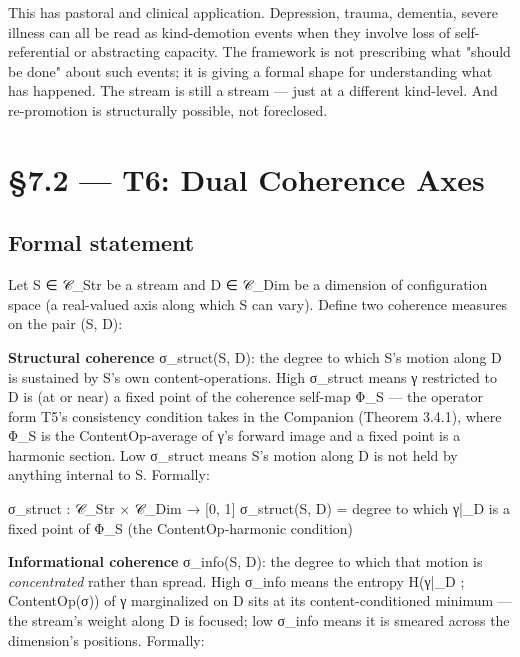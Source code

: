 \documentclass[11pt, openany]{book}
\newcommand{\sectionbreak}{\clearpage}
\begin{document}
This has pastoral and clinical application. Depression, trauma, dementia, severe illness can all be read as kind-demotion events when they involve loss of self-referential or abstracting capacity. The framework is not prescribing what "should be done" about such events; it is giving a formal shape for understanding what has happened. The stream is still a stream --- just at a different kind-level. And re-promotion is structurally possible, not foreclosed.

\sectionbreak

\section{§7.2 --- T6: Dual Coherence Axes}

\subsection{Formal statement}

Let S ∈ 𝒞\_\allowbreak{}Str be a stream and D ∈ 𝒞\_\allowbreak{}Dim be a dimension of configuration space (a real-valued axis along which S can vary). Define two coherence measures on the pair (S, D):

\textbf{Structural coherence} σ\_\allowbreak{}struct(S, D): the degree to which S's motion along D is sustained by S's own content-operations. High σ\_\allowbreak{}struct means γ restricted to D is (at or near) a fixed point of the coherence self-map Φ\_\allowbreak{}S --- the operator form T5's consistency condition takes in the Companion (Theorem 3.4.1), where Φ\_\allowbreak{}S is the ContentOp-average of γ's forward image and a fixed point is a harmonic section. Low σ\_\allowbreak{}struct means S's motion along D is not held by anything internal to S. Formally:

\begin{Code}
σ_struct : 𝒞_Str × 𝒞_Dim → [0, 1]
σ_struct(S, D) = degree to which γ|_D is a fixed point of Φ_S (the ContentOp-harmonic condition)
\end{Code}

\textbf{Informational coherence} σ\_\allowbreak{}info(S, D): the degree to which that motion is \textit{concentrated} rather than spread. High σ\_\allowbreak{}info means the entropy H(γ|\_\allowbreak{}D ; ContentOp(σ)) of γ marginalized on D sits at its content-conditioned minimum --- the stream's weight along D is focused; low σ\_\allowbreak{}info means it is smeared across the dimension's positions. Formally:
\end{document}
